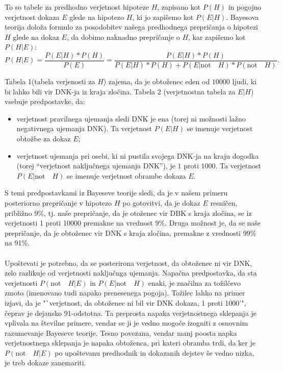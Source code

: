 \documentclass[a4paper,12pt]{article}
\begin{document}
To so tabele za predhodno verjetnost hipoteze $H$, zapisano kot $P(H)$ in pogojno verjetnost dokaza $E$ glede na hipotezo $H$, ki 
jo zapišemo kot $P(E \lvert H)$. Bayesova teorija doloža formulo za posodobitev našega predhodnega prepričanja o hipotezi $H$ glede na 
dokaz $E$, da dobimo naknadno prepričanje o $H$, kar zapišemo kot $P(H \lvert E)$:
\[P(H \lvert E) = \frac{P(E \lvert H)*P(H)}{P(E)} = \frac{P(E \lvert H)*P(H)}{P(E \lvert H)*P(H) + P(E \lvert \text{not}\quad H)*P(\text{not}\quad H)}.\]

Tabela 1(tabela verjenosti za $H$) zajema, da je obtoženec eden od $10000$ ljudi, ki bi lahko bili vir DNK-ja iz kraja zločina. Tabela 2 
(verjetnostna tabela za $E \lvert H$) vsebuje predpostavke, da: 
\begin{itemize}
    \item verjetnost pravilnega ujemanja sledi DNK je ena (torej ni možnosti lažno negativnega ujemanja DNK). Ta verjetnost $P(E \lvert H)$ 
          se imenuje verjetnost obtožbe za dokaz $E$;
    \item verjetnost ujemanja pri osebi, ki ni pustila svojega DNK-ja na kraju dogodka (torej "`verjetnost naključnega ujemanja DNK"'), je $1$ 
          proti $1000$. Ta verjetnost $P(E \lvert \text{not}\quad H)$ se imenuje verjetnost obrambe dokaza $E$.
\end{itemize}

S temi predpostavkami iz Bayeseve teorije sledi, da je v našem primeru posteriorno prepričanje v hipotezo $H$ po gotovitvi, da je dokaz $E$ 
resničen, približno 9\%, tj. naše prepričanje, da je otoženec vir DBK s kraja zločina, se iz verjetnosti 1 proti 10000 premakne na vrednost 9\%. 
Druga možnost je, da se naše prepričanje, da je obtoženec vir DNK s kraja zločina, premakne z vrednosti 99\% na 91\%. \\ \\

Upoštevati je potrebno, da se posterirona verjetnost, da obtoženec ni vir DNK, zelo razlikuje od verjetnosti naključnga ujemanja. Napačna 
predpostavka, da sta verjetnosti $P(\text{not}\quad H \lvert E)$ in $P(E \lvert \text{not}\quad H)$ enaki, je značilna za 
tožilčevo zmoto (imenovano tudi napako prenesenega pogoja). Tožilec lahko na primer izjavi, da je "`verjetnost, da obtoženec ni bil vir DNK 
dokaza, 1 proti 1000'", čeprav je dejansko 91-odstotna. Ta preprosta napaka verjetnostnega sklepanja je vplivala na številne primere, vendar 
se ji je vedno mogoče izogniti z osnovnim razumevanje Bayeseve teorije. Tesno povezana, vendar manj poosta napka verjetnostnega sklepanja je 
napaka obtoženca, pri kateri obramba trdi, da ker je $P(\text{not}\quad H \lvert E)$ po upoštevanu predhodnik in dokazanih dejstev 
še vedno nizka, je treb dokaze zanemariti. \\ \\
\end{document}
